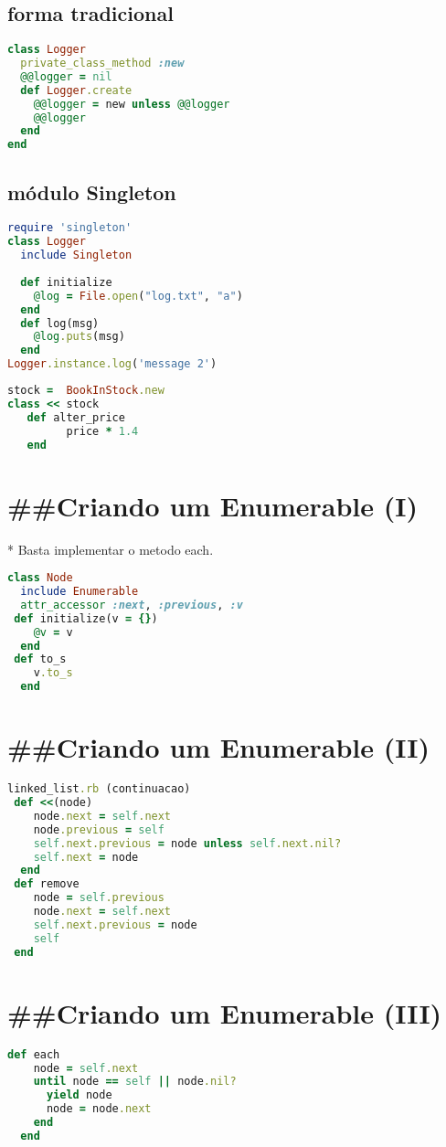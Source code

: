 \documentclass[serif,mathserif]{article}
\begin{document}
\subsection{forma tradicional}
\begin{lstlisting}[language=ruby]
class Logger
  private_class_method :new
  @@logger = nil
  def Logger.create
    @@logger = new unless @@logger
    @@logger
  end
end
\end{lstlisting}

\subsection{módulo Singleton}
\begin{lstlisting}[language=ruby]
require 'singleton'
class Logger
  include Singleton
  
  def initialize
    @log = File.open("log.txt", "a")
  end
  def log(msg)
    @log.puts(msg)
  end
Logger.instance.log('message 2')
\end{lstlisting}

\begin{lstlisting}[language=ruby]
stock =  BookInStock.new
class << stock
   def alter_price
         price * 1.4
   end
\end{lstlisting}

\section{\#\#Criando um Enumerable (I)}
  *  Basta implementar o metodo each. 
\begin{lstlisting}[language=ruby]
class Node
  include Enumerable 
  attr_accessor :next, :previous, :v
 def initialize(v = {})
    @v = v
  end
 def to_s
    v.to_s
  end
\end{lstlisting}

\section{\#\#Criando um Enumerable (II)}
\begin{lstlisting}[language=ruby]
linked_list.rb (continuacao)
 def <<(node)
    node.next = self.next
    node.previous = self
    self.next.previous = node unless self.next.nil?
    self.next = node
  end
 def remove
    node = self.previous
    node.next = self.next
    self.next.previous = node
    self
 end
\end{lstlisting}

\section{\#\#Criando um Enumerable (III)}
\begin{lstlisting}[language=ruby]
  def each
    node = self.next
    until node == self || node.nil?
      yield node
      node = node.next
    end
  end

\end{lstlisting}
\end{document}

